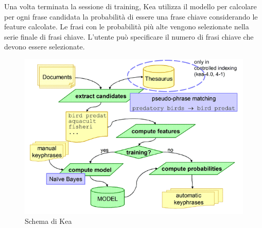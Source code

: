 Una volta terminata la sessione di training, Kea utilizza il modello per calcolare per ogni frase candidata la probabilità di essere una frase chiave considerando le feature calcolate. Le frasi con le probabilità più alte vengono selezionate nella serie finale di frasi chiave. L'utente può specificare il numero di frasi chiave che devono essere selezionate\cite{kea}.

\begin{figure}[H]
\centering
\includegraphics[scale=1]{res/kea_diagram.png}
\caption{Schema di Kea}
\label{fig:kea}
\end{figure}


